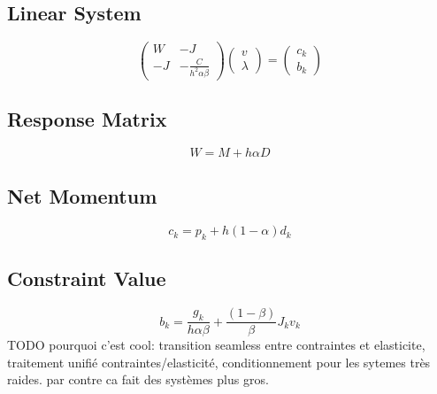 \documentclass{article}
\newcommand{\mat}[1]{ \begin{pmatrix} #1 \end{pmatrix} }
\begin{document}
\subsection*{Linear System}
\begin{equation}
  \label{eq:time-stepping-kkt}
  \mat{ W & -J \\
    -J & -\frac{C}{h^2 \alpha \beta} } \mat{v \\ \lambda} = \mat{c_k \\ b_k}
\end{equation}
%
\subsection*{Response Matrix}
%
\begin{equation}
  W = M + h\alpha D
\end{equation}
%
\subsection*{Net Momentum}
%
\begin{equation}
c_k = p_k + h (1 - \alpha) d_k  
\end{equation}
%
\subsection*{Constraint Value}
%
\begin{equation}
  b_k = \frac{g_k}{h \alpha \beta} + \frac{( 1 - \beta)}{\beta} J_k v_k
\end{equation}
%
TODO pourquoi c'est cool: transition seamless entre contraintes et
elasticite, traitement unifié contraintes/elasticité, conditionnement
pour les sytemes très raides. par contre ca fait des systèmes plus gros.
%
\end{document}
